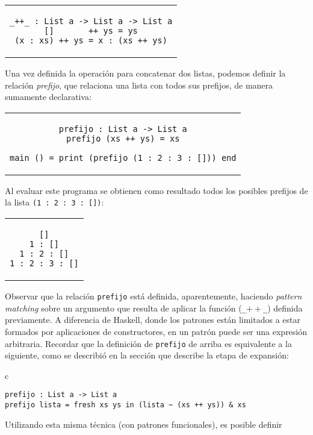 \begin{center}
\begin{tabular}{c}
\begin{lstlisting}[mathescape=true]
_++_ : List a -> List a -> List a
[]       ++ ys = ys
(x : xs) ++ ys = x : (xs ++ ys)
\end{lstlisting}
\end{tabular}
\end{center}
Una vez definida la operación para concatenar dos listas,
podemos definir la relación {\em prefijo},
que relaciona una lista con todos sus prefijos,
de manera sumamente declarativa:
\begin{center}
\begin{tabular}{c}
\begin{lstlisting}[mathescape=true]
prefijo : List a -> List a
prefijo (xs ++ ys) = xs

main () = print (prefijo (1 : 2 : 3 : [])) end
\end{lstlisting}
\end{tabular}
\end{center}
Al evaluar este programa se obtienen como resultado todos los posibles prefijos de
la lista \verb|(1 : 2 : 3 : [])|:
\begin{center}
\begin{tabular}{c}
\begin{lstlisting}[mathescape=true]
[]
1 : []
1 : 2 : []
1 : 2 : 3 : []
\end{lstlisting}
\end{tabular}
\end{center}
Observar que la relación \verb|prefijo| está definida,
aparentemente, haciendo {\em pattern matching}
sobre un argumento que resulta
de aplicar la función (\texttt{\_$++$\_}) definida previamente.
A diferencia de Haskell, donde los patrones están limitados a
estar formados por aplicaciones de constructores,
en \nuflo un patrón puede ser una expresión arbitraria.
Recordar que la definición de \texttt{prefijo} de arriba es equivalente
a la siguiente, como se describió en la sección que describe
la etapa de expansión:
\begin{center}
\begin{tabular}{c}
\begin{lstlisting}[mathescape=true]
prefijo : List a -> List a
prefijo lista = fresh xs ys in (lista ~ (xs ++ ys)) & xs
\end{lstlisting}
\end{tabular}
\end{center}
Utilizando esta misma técnica (con patrones funcionales), es posible definir
